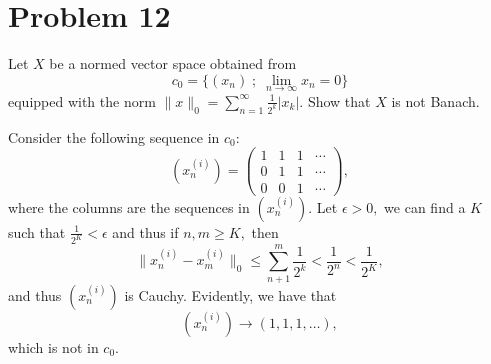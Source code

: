 \documentclass[11pt]{article}
\begin{document}
\newpage
\section*{Problem 12}
Let $X$ be a normed vector space obtained from 
\[c_0 = \{(x_n) \; ; \; \lim_{n\to \infty}x_n = 0\}\] equipped with the norm $\|x\|_0 = \sum_{n=1}^\infty \frac{1}{2^k}|x_k|.$ Show that $X$ is not Banach.

\begin{solution}
    Consider the following sequence in $c_0:$
    \[(x_{n}^{(i)}) = 
    \begin{pmatrix}
        1 & 1 & 1 & \cdots \\
        0 & 1 & 1 & \cdots \\
        0 & 0 & 1 & \cdots 
    \end{pmatrix},\] where the columns are the sequences in $(x_{n}^{(i)}).$ Let $\epsilon>0,$ we can find a $K$ such that $\frac{1}{2^K} < \epsilon$ and thus if $n,m \geq K,$ then
    \[\|x_{n}^{(i)} - x_{m}^{(i)}\|_0 \leq \sum_{n+1}^m\frac{1}{2^k} < \frac{1}{2^n} < \frac{1}{2^K},\] and thus $(x_{n}^{(i)})$ is Cauchy. Evidently, we have that 
    \[(x_{n}^{(i)}) \to (1,1,1,\dots),\] which is not in $c_0.$
\end{solution}
\newpage
\end{document}
